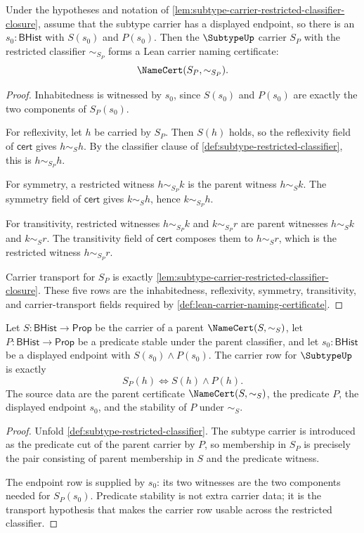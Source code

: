 \begin{theorem}
\label{thm:subtype-restricted-classifier-namecert}
Under the hypotheses and notation of \autoref{lem:subtype-carrier-restricted-classifier-closure}, assume that the subtype carrier has a displayed endpoint, so there is an $s_0:\mathsf{BHist}$ with $S(s_0)$ and $P(s_0)$. Then the $\SubtypeUp$ carrier $S_P$ with the restricted classifier $\sim_{S_P}$ forms a Lean carrier naming certificate:
$$
\NameCert(S_P,\sim_{S_P}).
$$
\end{theorem}
\begin{proof}
Inhabitedness is witnessed by $s_0$, since $S(s_0)$ and $P(s_0)$ are exactly the two components of $S_P(s_0)$.

For reflexivity, let $h$ be carried by $S_P$. Then $S(h)$ holds, so the reflexivity field of $\mathsf{cert}$ gives $h\sim_S h$. By the classifier clause of \autoref{def:subtype-restricted-classifier}, this is $h\sim_{S_P}h$.

For symmetry, a restricted witness $h\sim_{S_P}k$ is the parent witness $h\sim_S k$. The symmetry field of $\mathsf{cert}$ gives $k\sim_S h$, hence $k\sim_{S_P}h$.

For transitivity, restricted witnesses $h\sim_{S_P}k$ and $k\sim_{S_P}r$ are parent witnesses $h\sim_S k$ and $k\sim_S r$. The transitivity field of $\mathsf{cert}$ composes them to $h\sim_S r$, which is the restricted witness $h\sim_{S_P}r$.

Carrier transport for $S_P$ is exactly \autoref{lem:subtype-carrier-restricted-classifier-closure}. These five rows are the inhabitedness, reflexivity, symmetry, transitivity, and carrier-transport fields required by \autoref{def:lean-carrier-naming-certificate}.
\end{proof}

\begin{theorem}
\label{thm:subtype-obligation-carrier-source}
Let $S:\mathsf{BHist}\to\mathsf{Prop}$ be the carrier of a parent $\NameCert(S,\sim_S)$, let $P:\mathsf{BHist}\to\mathsf{Prop}$ be a predicate stable under the parent classifier, and let $s_0:\mathsf{BHist}$ be a displayed endpoint with $S(s_0)\land P(s_0)$. The carrier row for $\SubtypeUp$ is exactly
$$
S_P(h)\Longleftrightarrow S(h)\land P(h).
$$
The source data are the parent certificate $\NameCert(S,\sim_S)$, the predicate $P$, the displayed endpoint $s_0$, and the stability of $P$ under $\sim_S$.
\end{theorem}
\begin{proof}
Unfold \autoref{def:subtype-restricted-classifier}. The subtype carrier is introduced as the predicate cut of the parent carrier by $P$, so membership in $S_P$ is precisely the pair consisting of parent membership in $S$ and the predicate witness.

The endpoint row is supplied by $s_0$: its two witnesses are the two components needed for $S_P(s_0)$. Predicate stability is not extra carrier data; it is the transport hypothesis that makes the carrier row usable across the restricted classifier.
\end{proof}


